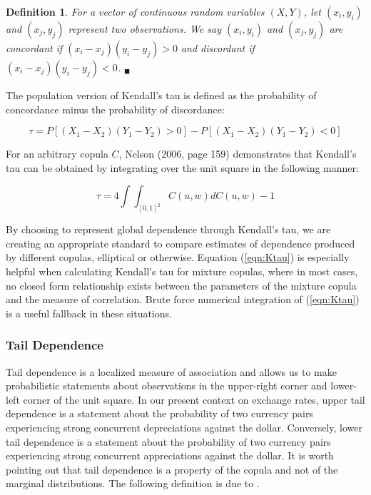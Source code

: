 \documentclass[12pt]{article}
\newtheorem{defn}{Definition}
\begin{document}
\begin{defn}
	For a vector of continuous random variables $\left(X,Y\right)$, let $\left(x_{i},y_{i}\right)$ and $\left(x_{j},y_{j}\right)$ represent two observations. We say $\left(x_{i},y_{i}\right)$ and $\left(x_{j},y_{j}\right)$ are concordant if $\left(x_{i} - x_{j}\right)\left(y_{i}-y_{j}\right) > 0$ and discordant if $\left(x_{i}-x_{j}\right)\left(y_{i} - y_{j}\right) < 0$. $_{\blacksquare}$
\end{defn}

The population version of Kendall's tau is defined as the probability of concordance minus the probability of discordance:

\begin{equation}
	\tau = P\left[\left(X_{1} - X_{2}\right)\left(Y_{1} - Y_{2}\right) > 0\right] - P\left[\left(X_{1} - X_{2}\right)\left(Y_{1} - Y_{2}\right) < 0\right]
\end{equation}

For an arbitrary copula $C$, Nelson (2006, page 159) demonstrates that Kendall's tau can be obtained by integrating over the unit square in the following manner:

\begin{equation} \label{eqn:Ktau}
	\tau = 4\int\int_{\left[0,1\right]^{2}}C\left(u,w\right)dC\left(u,w\right) - 1 
\end{equation}

By choosing to represent global dependence through Kendall's tau, we are creating an appropriate standard to compare estimates of dependence produced by different copulas, elliptical or otherwise. Equation (\ref{eqn:Ktau}) is especially helpful when calculating Kendall's tau for mixture copulas, where in most cases, no closed form relationship exists between the parameters of the mixture copula and the measure of correlation. Brute force numerical integration of (\ref{eqn:Ktau}) is a useful fallback in these situations.

\subsubsection{Tail Dependence}

Tail dependence is a localized measure of association and allows us to make probabilistic statements about observations in the upper-right corner and lower-left corner of the unit square. In our present context on exchange rates, upper tail dependence is a statement about the probability of two currency pairs experiencing strong concurrent depreciations against the dollar. Conversely, lower tail dependence is a statement about the probability of two currency pairs experiencing strong concurrent appreciations against the dollar. It is worth pointing out that tail dependence is a property of the copula and not of the marginal distributions. The following definition is due to \cite{Joe_1997}.
\end{document}

